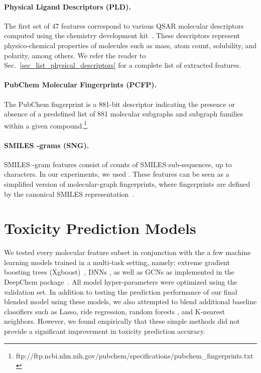 \documentclass[11pt,a4paper]{article}
\begin{document}
\paragraph{Physical Ligand Descriptors (PLD).}The first set of 47 features correspond to various QSAR molecular descriptors computed using
the chemistry development kit~\cite{Steinbeck:2003aa}. These descriptors represent
physico-chemical properties of molecules such as mass, atom count, solubility,
and polarity, among others. We refer the reader to Sec.~\ref{sec_list_physical_descriptors} 
for a complete list of extracted features. 

\paragraph{PubChem Molecular Fingerprints (PCFP).}The PubChem fingerprint is a 881-bit descriptor indicating the presence or absence 
of a predefined list of 881 molecular subgraphs and subgraph families within a given
compound.\footnote{ftp://ftp.ncbi.nlm.nih.gov/pubchem/specifications/pubchem\_fingerprints.txt}. 

\paragraph{SMILES -grams (SNG).}SMILES -gram features consist of counts of SMILES sub-sequences, up to  characters.
In our experiments, we used . These features can be seen as a simplified version of
molecular-graph fingerprints, where fingerprints are defined by the canonical SMILES
representation~\cite{Steinbeck:2003aa}.

\section{Toxicity Prediction Models}
\label{sec:models}
We tested every molecular feature subset in conjunction with the a few machine
learning models trained in a multi-task setting, namely:
extreme gradient boosting trees (Xgboost)~\cite{Chen2016},
DNNs \cite{CBH2015}, as well as GCNs as implemented in the 
DeepChem package~\cite{Wu:2017}. All model hyper-parameters were optimized using
the validation set. In addition to testing the prediction performance of our
final blended model using these models, we also attempted to blend additional
baseline classifiers such as Lasso, ride regression, random forests \cite{Ho1995},
and K-nearest neighbors. However, we found empirically that these simple 
methods did not provide a significant improvement in toxicity prediction 
accuracy.
\end{document}
